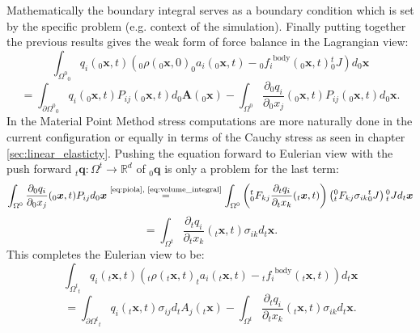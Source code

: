 \documentclass[m,times]{cgMA}
\begin{document}
Mathematically the boundary integral serves as a boundary condition which is set by the specific problem (e.g. context of the simulation). Finally putting together the previous results gives the weak form of force balance in the Lagrangian view:
$$
\int _ { \Omega ^ { 0 } } _0q _ { i } ( _0\boldsymbol { x } , t ) \left(_0\rho (_0\boldsymbol{x} , 0 ) _0a _{ i } (_0\boldsymbol{x} , t ) - {_0f_i} ^ {\text{body}}(_0\boldsymbol{x},t) {^t_0J}\right) d _0\boldsymbol{x}
$$
\begin{equation} \label{eq:lagr_force_bal}
  = \int _ { \partial \Omega ^ { 0 } } _0q _ { i } ( _0\boldsymbol { x } , t ) P _ {ij} ( _0\boldsymbol{x} , t)
  d_0\boldsymbol{A}(_0\boldsymbol{x})
  -\int _ { \Omega ^ { 0 } }  \frac{\partial _0q _ { i }}{\partial _0x_j} ( _0\boldsymbol { x } , t ) P _ {ij}( _0\boldsymbol{x} , t )
  d_0\boldsymbol{x}.
\end{equation}
In the Material Point Method stress computations are more naturally done in the current configuration or equally in terms of the Cauchy stress as seen in chapter \ref{sec:linear_elasticty}. Pushing the equation forward to Eulerian view with the push forward $_t\boldsymbol{q}:\Omega^t \rightarrow \mathbb{R}^d$ of $_0\boldsymbol{q}$ is only a problem for the last term:
$$
\int _ { \Omega ^ { 0 } }  \frac{\partial _0q _ { i }}{\partial _0x_j} ( _0\boldsymbol { x } , t ) P _ {ij} d_0\boldsymbol{x}
\stackrel{\text{\ref{eq:piola}, \ref{eq:volume_integral}}}{=}
\int _ { \Omega ^ { 0 } }  \left({^t_0}F_{kj}\frac{\partial _tq _ { i }}{\partial _tx_k} ( _t\boldsymbol { x } , t )\right) \left({_t^0}F_{kj} \sigma _ {ik} {_0^tJ}\right) {_t^0J} d_t\boldsymbol{x}
$$
\begin{equation}  =  \int _ { \Omega ^ { t } } \frac{\partial _tq _ { i }}{\partial _tx_k} ( _t\boldsymbol { x } , t )\sigma _ {ik} d_t\boldsymbol{x}.
\end{equation}
This completes the Eulerian view to be:
$$
\int _ { \Omega ^ { t } } _tq _ { i } ( _t\boldsymbol { x } , t ) \left(_t\rho (_t\boldsymbol{x} , t) _ta _{ i } (_t\boldsymbol{x} , t ) - {_tf_i} ^ {\text{body}}(_t\boldsymbol{x},t)\right) d _t\boldsymbol{x}
$$
\begin{equation}\label{eq:eul_force_bal}
  = \int _ { \partial \Omega ^ { t } } _tq _ { i } ( _t\boldsymbol { x } , t ) \sigma _ {ij} d_tA_j(_t\boldsymbol{x}) -  \int _ { \Omega ^ { t } } \frac{\partial _tq _ { i }}{\partial _tx_k} ( _t\boldsymbol { x } , t )\sigma _ {ik} d_t\boldsymbol{x}.
\end{equation}
\begin{flushright}\cite{MPM:COURSE}\cite{strang2007computational}\cite{bathe2006finite}\end{flushright}
\end{document}
